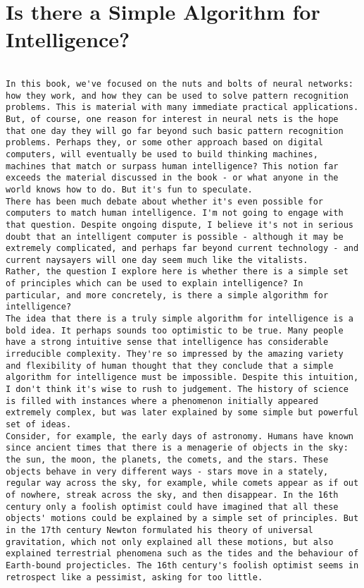 
\chapter{ Is there a Simple Algorithm for Intelligence?}
\label{sec:Is thereASimpleAlgorithmforIntelligence?}

\begin{lstlisting}

In this book, we've focused on the nuts and bolts of neural networks: how they work, and how they can be used to solve pattern recognition problems. This is material with many immediate practical applications. But, of course, one reason for interest in neural nets is the hope that one day they will go far beyond such basic pattern recognition problems. Perhaps they, or some other approach based on digital computers, will eventually be used to build thinking machines, machines that match or surpass human intelligence? This notion far exceeds the material discussed in the book - or what anyone in the world knows how to do. But it's fun to speculate.
There has been much debate about whether it's even possible for computers to match human intelligence. I'm not going to engage with that question. Despite ongoing dispute, I believe it's not in serious doubt that an intelligent computer is possible - although it may be extremely complicated, and perhaps far beyond current technology - and current naysayers will one day seem much like the vitalists.
Rather, the question I explore here is whether there is a simple set of principles which can be used to explain intelligence? In particular, and more concretely, is there a simple algorithm for intelligence?
The idea that there is a truly simple algorithm for intelligence is a bold idea. It perhaps sounds too optimistic to be true. Many people have a strong intuitive sense that intelligence has considerable irreducible complexity. They're so impressed by the amazing variety and flexibility of human thought that they conclude that a simple algorithm for intelligence must be impossible. Despite this intuition, I don't think it's wise to rush to judgement. The history of science is filled with instances where a phenomenon initially appeared extremely complex, but was later explained by some simple but powerful set of ideas.
Consider, for example, the early days of astronomy. Humans have known since ancient times that there is a menagerie of objects in the sky: the sun, the moon, the planets, the comets, and the stars. These objects behave in very different ways - stars move in a stately, regular way across the sky, for example, while comets appear as if out of nowhere, streak across the sky, and then disappear. In the 16th century only a foolish optimist could have imagined that all these objects' motions could be explained by a simple set of principles. But in the 17th century Newton formulated his theory of universal gravitation, which not only explained all these motions, but also explained terrestrial phenomena such as the tides and the behaviour of Earth-bound projecticles. The 16th century's foolish optimist seems in retrospect like a pessimist, asking for too little.

\end{lstlisting}
